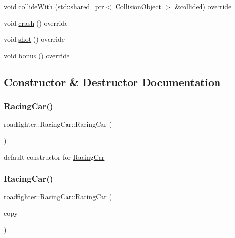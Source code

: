 \begin{DoxyCompactItemize}
\item 
void \hyperlink{classroadfighter_1_1RacingCar_a1de00cf7c8df548e8ab57a27cefb7345}{collide\+With} (std\+::shared\+\_\+ptr$<$ \hyperlink{classroadfighter_1_1CollisionObject}{Collision\+Object} $>$ \&collided) override
\item 
void \hyperlink{classroadfighter_1_1RacingCar_a2f5018f17852d75682afd78e806b8e4c}{crash} () override
\item 
void \hyperlink{classroadfighter_1_1RacingCar_a20c4363a1d31cc17d7d82c8f9a219d2d}{shot} () override
\item 
void \hyperlink{classroadfighter_1_1RacingCar_a5858dd3f2c7bb49782b29c0a90846a6c}{bonus} () override
\end{DoxyCompactItemize}


\subsection{Constructor \& Destructor Documentation}
\mbox{\label{classroadfighter_1_1RacingCar_ad36c66bdc36a849289d42b5061be2572}} 
\subsubsection{\texorpdfstring{Racing\+Car()}{RacingCar()}\hspace{0.1cm}{\footnotesize\ttfamily [1/3]}}
{\footnotesize\ttfamily roadfighter\+::\+Racing\+Car\+::\+Racing\+Car (\begin{DoxyParamCaption}{ }\end{DoxyParamCaption})\hspace{0.3cm}{\ttfamily [default]}}

default constructor for \hyperlink{classroadfighter_1_1RacingCar}{Racing\+Car} \mbox{\label{classroadfighter_1_1RacingCar_ad69732f995ae7a2ee44315cd6a3fc69a}} 
\subsubsection{\texorpdfstring{Racing\+Car()}{RacingCar()}\hspace{0.1cm}{\footnotesize\ttfamily [2/3]}}
{\footnotesize\ttfamily roadfighter\+::\+Racing\+Car\+::\+Racing\+Car (\begin{DoxyParamCaption}\item[{const \hyperlink{classroadfighter_1_1RacingCar}{Racing\+Car} \&}]{copy }\end{DoxyParamCaption})\hspace{0.3cm}{\ttfamily [default]}}

